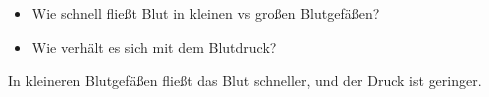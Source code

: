 \documentclass{beamer}
\begin{document}
\begin{frame}
\begin{columns}[c]
\begin{column}{5cm}

\begin{itemize}
\item
Wie schnell flie{\ss}t Blut in kleinen vs gro{\ss}en Blutgefä{\ss}en?
\item
Wie verhält es sich mit dem Blutdruck?
\end{itemize}

\pause

In \textcolor{theme}{kleineren} Blutgefäßen fließt das Blut \textcolor{theme}{schneller}, und der Druck ist \textcolor{theme}{geringer}. 


\end{column}
\end{columns}


\end{frame}
\end{document}
